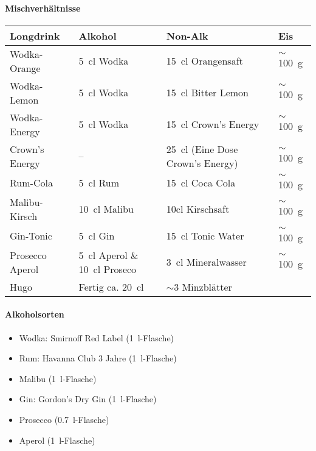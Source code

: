 \paragraph{Mischverhältnisse}
\begin{center}
  \begin{tabular}{llll}
    Longdrink & Alkohol & Non-Alk & Eis \\ \hline\hline
    Wodka-Orange &  \SI{5}{\centi\litre} Wodka & \SI{15}{\centi\litre} Orangensaft & $\sim$\SI{100}{\gram} \\ \hline
    Wodka-Lemon & \SI{5}{\centi\litre} Wodka & \SI{15}{\centi\litre} Bitter Lemon & $\sim$\SI{100}{\gram} \\ \hline
    Wodka-Energy & \SI{5}{\centi\litre} Wodka & \SI{15}{\centi\litre} Crown's Energy & $\sim$\SI{100}{\gram} \\ \hline
    Crown's Energy & -- & \SI{25}{\centi\litre} (Eine Dose Crown's Energy) & $\sim$\SI{100}{\gram} \\ \hline
    Rum-Cola & \SI{5}{\centi\litre} Rum & \SI{15}{\centi\litre} Coca Cola & $\sim$\SI{100}{\gram} \\ \hline
    Malibu-Kirsch & \SI{10}{\centi\litre} Malibu & 10cl Kirschsaft & $\sim$\SI{100}{\gram} \\ \hline
    Gin-Tonic & \SI{5}{\centi\litre} Gin & \SI{15}{\centi\litre} Tonic Water & $\sim$\SI{100}{\gram} \\ \hline
    Prosecco Aperol & \SI{5}{\centi\litre} Aperol \& \SI{10}{\centi\litre} Proseco & \SI{3}{\centi\litre} Mineralwasser & $\sim$\SI{100}{\gram} \\ \hline
    Hugo & Fertig ca. \SI{20}{\centi\litre} & $\sim$3 Minzblätter
  \end{tabular}
\end{center}

\paragraph{Alkoholsorten}
\begin{itemize}
  \item Wodka: Smirnoff Red Label (\SI{1}{\litre}-Flasche)
  \item Rum: Havanna Club 3 Jahre (\SI{1}{\litre}-Flasche)
  \item Malibu (\SI{1}{\litre}-Flasche)
  \item Gin: Gordon's Dry Gin (\SI{1}{\litre}-Flasche)
  \item Prosecco (\SI{0.7}{\litre}-Flasche)
  \item Aperol (\SI{1}{\litre}-Flasche)
\end{itemize}


